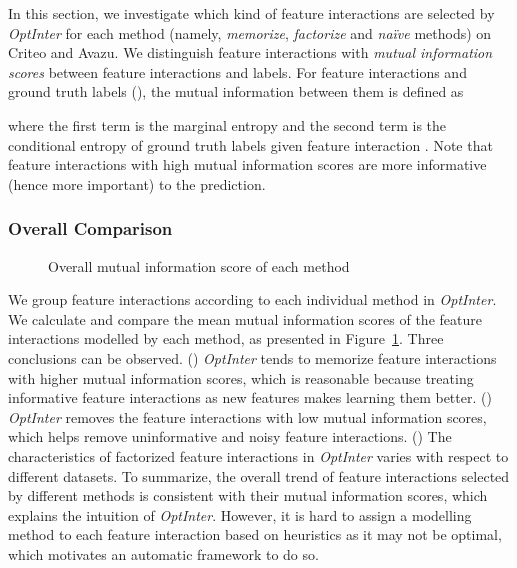 \documentclass[conference]{IEEEtran}
\begin{document}
In this section, we investigate which kind of feature interactions are selected by \textit{OptInter} for each method (namely, \emph{memorize}, \emph{factorize} and \emph{naïve} methods) on Criteo and Avazu. 
We distinguish feature interactions with \emph{mutual information scores} between feature interactions and labels. For feature interactions  and ground truth labels  (), the mutual information between them is defined as


where the first term is the marginal entropy and the second term is the conditional entropy of ground truth labels  given feature interaction . Note that feature interactions with high mutual information scores are more informative (hence more important) to the prediction. 

\subsubsection{Overall Comparison}

\begin{figure}[!htbp]
\centering
{}

\caption{Overall mutual information score of each method}
\label{fig:dataset} 
\end{figure}

We group feature interactions according to each individual method in \textit{OptInter}. We calculate and compare the mean mutual information scores of the feature interactions modelled by each method, as presented in Figure~\ref{fig:dataset}. Three conclusions can be observed. () \textit{OptInter} tends to memorize feature interactions with higher mutual information scores, which is reasonable because treating informative feature interactions as new features makes learning them better. () \textit{OptInter} removes the feature interactions with low mutual information scores, which helps remove uninformative and noisy feature interactions. () The characteristics of factorized feature interactions in \textit{OptInter} varies with respect to different datasets. 
To summarize, the overall trend of feature interactions selected by different methods is consistent with their mutual information scores, which explains the intuition of \textit{OptInter}. However, it is hard to assign a modelling method to each feature interaction based on heuristics as it may not be optimal, which motivates an automatic framework to do so.
\end{document}
